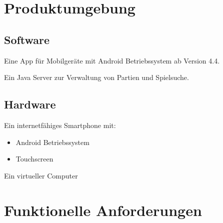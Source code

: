 \documentclass[parskip=full]{scrartcl}
\begin{document}
	\section{Produktumgebung}
	\subsection{Software}
	\begin{description}
		\item Eine App für Mobilgeräte mit \gls{Android} Betriebssystem ab Version 4.4.
		\item Ein Java Server zur Verwaltung von Partien und Spielsuche.		
	\end{description}
	\subsection{Hardware}
	\begin{description}			
		\item Ein internetfähiges \gls{Smartphone} mit:
		\begin{itemize}
			\item \gls{Android} Betriebssystem
			\item Touchscreen
		\end{itemize}
		\item Ein virtueller Computer
	\end{description}
	\pagebreak		  
	\section{Funktionelle Anforderungen}
\end{document}
